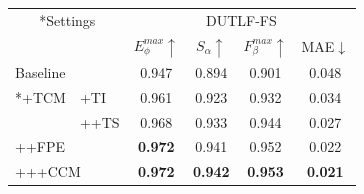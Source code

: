 \begin{table}
	\centering
	\label{chpt4:tab:abl_2}
		\begin{tabular}{llcccc}
			\toprule  %
			
			\multicolumn{2}{c}{ \multirow{2}*{Settings}}	& \multicolumn{4}{c}{DUTLF-FS} \\ %
			
			\cmidrule(r){3-6} 
			
			& & $E_{\phi}^{max}\uparrow$ & $S_{\alpha }\uparrow $ & $F_{\beta}^{max}\uparrow$ & MAE$\downarrow$ \\
			\midrule
			
			\multicolumn{2}{l}{ Baseline }     & 0.947 & 0.894 & 0.901 & 0.048 \\ 
			
			
			\midrule
			
			\multicolumn{1}{c}{ \multirow{2}*{+TCM}}	
			
			& +TI		& 0.961 & 0.923 & 0.932 & 0.034 \\ 
			& ++TS & 0.968 & 0.933 & 0.944 & 0.027 \\
			\midrule
			
			\multicolumn{2}{l}{++FPE} 		& \textbf{0.972} & 0.941 & 0.952 & 0.022 \\
			\multicolumn{2}{l}{+++CCM} 		& \textbf{0.972} & \textbf{0.942} & \textbf{0.953} & \textbf{0.021} \\ 
			
			
			\bottomrule
		\end{tabular}
\end{table}

